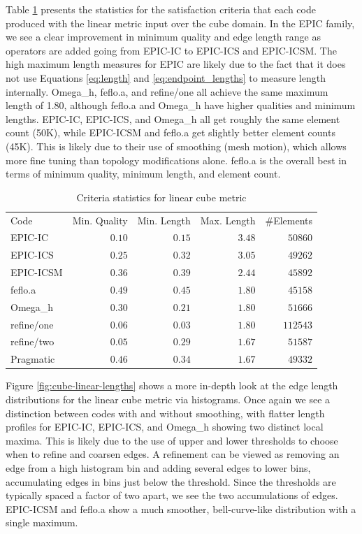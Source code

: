 \documentclass[3p,times,procedia,number]{elsarticle}
\begin{document}
Table \ref{tab:cube-linear-stats} presents the statistics
for the satisfaction criteria that each code
produced with the linear metric input over the cube domain.
In the EPIC family, we see a clear improvement in minimum
quality and edge length range as operators are added
going from EPIC-IC to EPIC-ICS and EPIC-ICSM.
The high maximum length measures for EPIC are likely due
to the fact that it does not use Equations \ref{eq:length}
and \ref{eq:endpoint_lengths} to measure length
internally.\cite{park-loseille-krakos-michal-adapt-decomposition}
Omega\_h, feflo.a, and refine/one
all achieve the same maximum length of 1.80, although
feflo.a and Omega\_h have higher qualities
and minimum lengths.
EPIC-IC, EPIC-ICS, and Omega\_h all get roughly
the same element count (50K), while EPIC-ICSM and feflo.a
get slightly better element counts (45K).
This is likely due to their use of smoothing (mesh motion),
which allows more fine tuning than topology modifications alone.
feflo.a is the overall best in terms of minimum
quality,
minimum length, and element count.

\begin{table}
\caption{Criteria statistics for linear cube metric}
\label{tab:cube-linear-stats}
\begin{tabular}{lrrrr}
Code & Min. Quality & Min. Length & Max. Length & \#Elements\\
EPIC-IC     & $0.10$&       $0.15$&       $3.48$&   $ 50860$\\
EPIC-ICS    & $0.25$&       $0.32$&       $3.05$&   $ 49262$\\
EPIC-ICSM   & $0.36$&       $0.39$&       $2.44$&   $ 45892$\\
feflo.a     & $0.49$&       $0.45$&       $1.80$&   $ 45158$\\
Omega\_h    & $0.30$&       $0.21$&       $1.80$&   $ 51666$\\
refine/one  & $0.06$&       $0.03$&       $1.80$&   $112543$\\
refine/two  & $0.05$&       $0.29$&       $1.67$&   $ 51587$\\
Pragmatic   & $0.46$&       $0.34$&       $1.67$&   $ 49332$\\
\end{tabular}
\end{table}

Figure \ref{fig:cube-linear-lengths} shows a more in-depth look
at the edge length distributions for the linear cube metric
via histograms.
Once again we see a distinction between codes with and without
smoothing, with flatter length profiles
for EPIC-IC, EPIC-ICS, and Omega\_h showing two distinct local maxima.
This is likely due to the use of upper and lower thresholds
to choose when to refine and coarsen edges.
A refinement can be viewed as removing an edge from a high
histogram bin and adding several edges to lower bins,
accumulating edges in bins just below the threshold.
Since the thresholds are typically spaced a factor of two apart,
we see the two accumulations of edges.
EPIC-ICSM and feflo.a show a much smoother, bell-curve-like distribution
with a single maximum.
\end{document}
